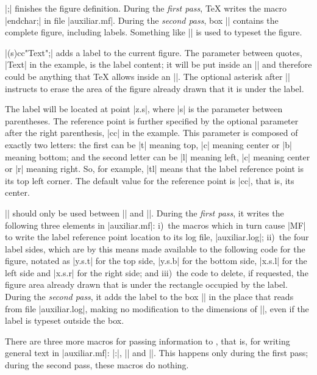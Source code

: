 \item |\MTendchar;| finishes the figure definition.  During the
{\it first pass}, {\TeX} writes the {\MF} macro |endchar;| in file
|auxiliar.mf|. During the {\it second pass}, box |\MTbox| contains the
complete figure, including labels.  Something like |\box\MTbox| is
used to typeset the figure.

\item |\MTlabel*(s)cc"Text";| adds a label to the current figure.
The parameter between quotes, |Text| in the example, is the label
content; it will be put inside an |\hbox| and therefore could be
anything that {\TeX} allows inside an |\hbox|. The optional asterisk
after |\MTlabel| instructs {\MTeX} to erase the area of the figure
already drawn that it is under the label.

The label will be located at {\MF} point |z.s|, where |s| is the parameter
between parentheses. The reference point is further specified by the
optional parameter after the right parenthesis, |cc| in the example.
This parameter is composed of exactly two letters: the first can be |t|
meaning top, |c| meaning center or |b| meaning bottom; and the second
letter can be |l| meaning left, |c| meaning center or |r| meaning right.
So, for example, |tl| means that the label reference point is its top
left corner. The default value for the reference point is |cc|, that is,
its center.

|\MTlabel| should only be used between |\MTbeginchar| and |\MTendchar|.
During the {\it first pass}, it writes the following three elements in
|auxiliar.mf|: i)~the {\MF} macros which in turn cause |MF| to write the
label reference point location to its log file, |auxiliar.log|; ii)~the
four label sides, which are by this means made available to the
following {\MF} code for the figure, notated as |y.s.t| for the top side,
|y.s.b| for the bottom side, |x.s.l| for the left side and |x.s.r| for the right
side; and iii)~the code to delete, if requested, the figure area already
drawn that is under the rectangle occupied by the label. During the {\it
second pass}, it adds the label to the box |\MTbox| in the place that
reads from file |auxiliar.log|, making no modification to the dimensions of
|\MTbox|, even if the label is typeset outside the box.

\endlist

There are three more macros for passing information to \MF, that is, for
writing general text in |auxiliar.mf|: |\MT:|, |\MTcode| and |\MTline|.
This happens only during the first pass; during the second pass, these
macros do nothing.

